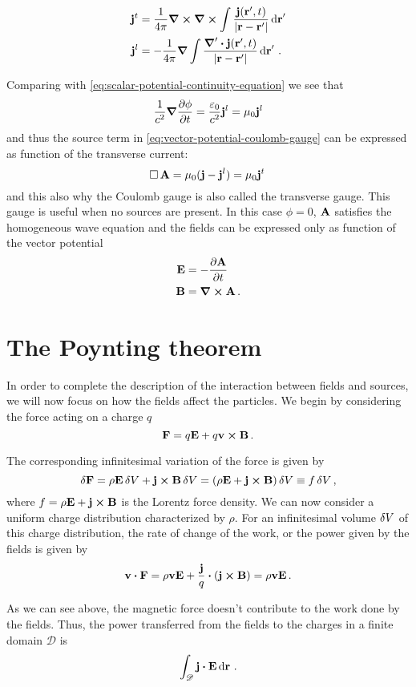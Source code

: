 \documentclass[12pt, class=report, crop=false]{standalone}
\begin{document}
\begin{align*}
  \vb{j}^t &= \frac{1}{4\pi} \curl \curl \int \frac{\vb{j}(\vb{r}',t)}{|\vb{r}-\vb{r}'|} \dd{\vb{r}}' \\
  \vb{j}^l &= -\frac{1}{4\pi} \grad \int
    \frac{\boldsymbol{\nabla}' \vdot \vb{j}(\vb{r}',t)}{|\vb{r}-\vb{r}'|} \dd{\vb{r}}'\,.
\end{align*}

Comparing with \cref{eq:scalar-potential-continuity-equation} we see that
\[
  \frac{1}{c^2} \grad{\pdv{\phi}{t}} = \frac{\varepsilon_0}{c^2} \vb{j}^l
  = \mu_0 \vb{j}^l
\]
and thus the source term in \cref{eq:vector-potential-coulomb-gauge} can
be expressed as function of the transverse current:
\[
  \operatorname{\Box} \vb{A} = \mu_0 (\vb{j} - \vb{j}^l) = \mu_0 \vb{j}^t\,
\]
and this also why the Coulomb gauge is also called the transverse gauge.
This gauge is useful when no sources are present. In this case \(\phi=0\),
\(\vb{A}\) satisfies the homogeneous wave equation and the fields can
be expressed only as function of the vector potential
\begin{align*}
  \vb{E} &= -\pdv{\vb{A}}{t} \\
  \vb{B} &= \curl{\vb{A}}\,.
\end{align*}

\section{The Poynting theorem}

In order to complete the description of the interaction between fields
and sources, we will now focus on how the fields affect the particles.
We begin by considering the force acting on a charge \(q\)
\[
  \vb{F} = q\vb{E} + q\vb{v} \cp \vb{B}\,.
\]

The corresponding infinitesimal variation of the force is given by
\[
  \var{\vb{F}} = \rho \vb{E} \var{V} + \vb{j} \cp \vb{B} \var{V}
    = (\rho \vb{E} + \vb{j} \cp \vb{B}) \var{V}
    \equiv f \var{V},
\]
where \(f = \rho \vb{E} + \vb{j} \cp \vb{B}\) is the Lorentz force
density. We can now consider a uniform charge distribution characterized
by \(\rho\). For an infinitesimal volume \(\var{V}\) of this charge distribution,
the rate of change of the work, or the power given by the
fields is given by
\[
  \vb{v} \vdot \vb{F} = \rho \vb{v} \vb{E} + \frac{\vb{j}}{q} \vdot (\vb{j} \cp \vb{B})
    = \rho \vb{v} \vb{E}\,.
\]

As we can see above, the magnetic force doesn't contribute to the work
done by the fields. Thus, the power transferred from the fields to the
charges in a finite domain \(\mathscr{D}\) is
\[
  \int_{\mathscr{D}} \vb{j} \vdot \vb{E} \dd{\vb{r}}\,.
\]
\end{document}

